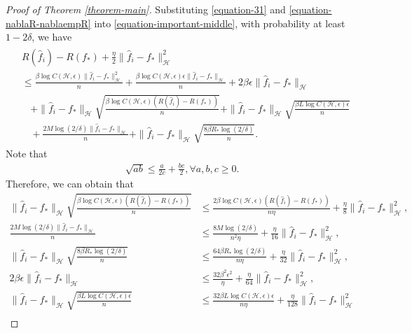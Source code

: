 \documentclass{article}
\begin{document}
\begin{proof}[Proof of Theorem \ref{theorem-main}]
  Substituting \eqref{equation-31} and \eqref{equation-nablaR-nablaempR} into \eqref{equation-important-middle},
  with probability at least $1-2\delta$, we have
  \begin{align}
    \label{equation-first-equation}
    \begin{aligned}
      &R(\hat{f}_i)-R(f_\ast)+\frac{\eta}{2}\|\hat{f}_i-f_\ast\|_\mathcal{H}^2\\
      &\leq \frac{\beta \log C(\mathcal{H},\epsilon)\|\hat{f}_i-f_\ast\|_\mathcal{H}^2}{n}+
   \frac{\beta \log C(\mathcal{H},\epsilon)\epsilon \|\hat{f}_i-f_\ast\|_\mathcal{H}}{n}+2\beta\epsilon \|\hat{f}_i-f_\ast\|_\mathcal{H}\\
   &~~~~+\|\hat{f}_i-f_\ast\|_\mathcal{H}\sqrt{\frac{\beta \log C(\mathcal{H},\epsilon)(R(\hat{f}_i)-R(f_\ast))}{n}}+
   \|\hat{f}_i-f_\ast\|_\mathcal{H}\sqrt{\frac{\beta L \log C(\mathcal{H},\epsilon)\epsilon}{n}}\\
   &~~~~+\frac{2M \log(2/\delta)\|\hat{f}_i-f_\ast\|_\mathcal{H}}{n}+\|\hat{f}_i-f_\ast\|_\mathcal{H}\sqrt{\frac{8\beta R_\ast \log(2/\delta)}{n}}.
    \end{aligned}
  \end{align}
  Note that
  \begin{align*}
    \sqrt{ab}\leq \frac{a}{2c}+\frac{bc}{2}, \forall a,b,c\geq 0.
  \end{align*}
  Therefore, we can obtain that
  \begin{align*}
    \|\hat{f}_i-f_\ast\|_\mathcal{H}\sqrt{\frac{\beta \log C(\mathcal{H},\epsilon)(R(\hat{f}_i)-R(f_\ast))}{n}}
    &\leq \frac{2\beta \log C(\mathcal{H},\epsilon)(R(\hat{f}_i)-R(f_\ast))}{n\eta}+\frac{\eta }{8}\|\hat{f}_i-f_\ast\|_\mathcal{H}^2,\\
    \frac{2M \log(2/\delta)\|\hat{f}_i-f_\ast\|_\mathcal{H}}{n}&\leq \frac{8M \log(2/\delta)}{n^2\eta}+\frac{\eta }{16}\|\hat{f}_i-f_\ast\|_\mathcal{H}^2,\\
    \|\hat{f}_i-f_\ast\|_\mathcal{H}\sqrt{\frac{8\beta R_\ast \log(2/\delta)}{n}}&\leq \frac{64\beta R_\ast\log(2/\delta)}{n\eta}+\frac{\eta }{32}\|\hat{f}_i-f_\ast\|_\mathcal{H}^2,\\
    2\beta\epsilon \|\hat{f}_i-f_\ast\|_\mathcal{H}&\leq \frac{32\beta^2\epsilon^2}{\eta}+\frac{\eta }{64}\|\hat{f}_i-f_\ast\|_\mathcal{H}^2,\\
    \|\hat{f}_i-f_\ast\|_\mathcal{H}\sqrt{\frac{\beta L \log C(\mathcal{H},\epsilon)\epsilon}{n}}&
    \leq \frac{32\beta L \log C(\mathcal{H},\epsilon)\epsilon}{n\eta}+\frac{\eta }{128}\|\hat{f}_i-f_\ast\|_\mathcal{H}^2\\

\end{align*}
\end{proof}
\end{document}
